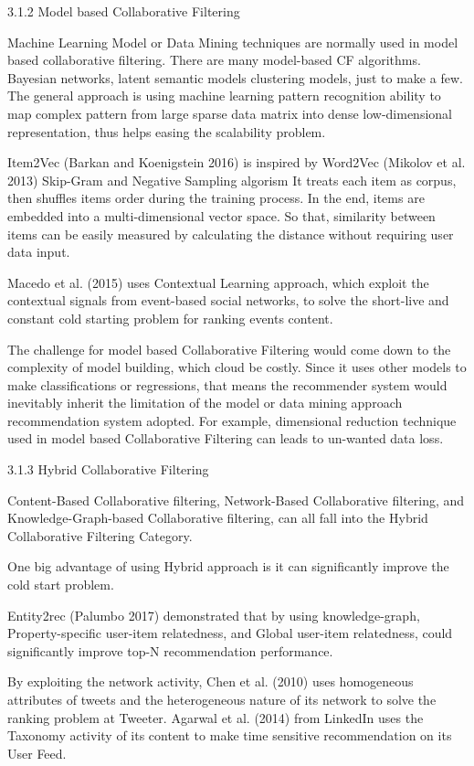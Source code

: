  

3.1.2 Model based Collaborative Filtering 

Machine Learning Model or Data Mining techniques are normally used in model based collaborative filtering. There are many model-based CF algorithms. Bayesian networks, latent semantic models clustering models, just to make a few. The general approach is using machine learning pattern recognition ability to map complex pattern from large sparse data matrix into dense low-dimensional representation, thus helps easing the scalability problem.  

Item2Vec (Barkan and Koenigstein 2016) is inspired by Word2Vec (Mikolov et al. 2013) Skip-Gram and Negative Sampling algorism It treats each item as corpus, then shuffles items order during the training process. In the end, items are embedded into a multi-dimensional vector space. So that, similarity between items can be easily measured by calculating the distance without requiring user data input.  

Macedo et al. (2015) uses Contextual Learning approach, which exploit the contextual signals from event-based social networks, to solve the short-live and constant cold starting problem for ranking events content. 

The challenge for model based Collaborative Filtering would come down to the complexity of model building, which cloud be costly.  Since it uses other models to make classifications or regressions, that means the recommender system would inevitably inherit the limitation of the model or data mining approach recommendation system adopted. For example, dimensional reduction technique used in model based Collaborative Filtering can leads to un-wanted data loss. 

 

3.1.3 Hybrid Collaborative Filtering 

Content-Based Collaborative filtering, Network-Based Collaborative filtering, and Knowledge-Graph-based Collaborative filtering, can all fall into the Hybrid Collaborative Filtering Category.  

One big advantage of using Hybrid approach is it can significantly improve the cold start problem.  

Entity2rec (Palumbo 2017) demonstrated that by using knowledge-graph, Property-specific user-item relatedness, and Global user-item relatedness, could significantly improve top-N recommendation performance. 

By exploiting the network activity, Chen et al. (2010) uses homogeneous attributes of tweets and the heterogeneous nature of its network to solve the ranking problem at Tweeter. Agarwal et al. (2014) from LinkedIn uses the Taxonomy activity of its content to make time sensitive recommendation on its User Feed. 

